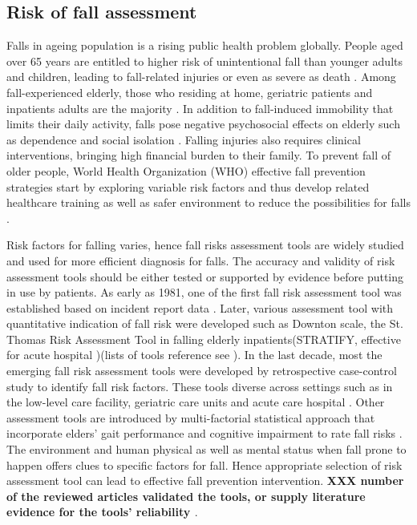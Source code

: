 \documentclass[conference,compsoc]{IEEEtran}
\begin{document}
\subsection{Risk of fall assessment}
Falls in ageing population is a rising public health problem globally. People aged over 65 years are entitled to higher risk of unintentional fall than younger adults and children, leading to fall-related injuries or even as severe as death \cite{who_2012}. Among fall-experienced elderly, those who residing at home, geriatric patients and inpatients adults are the majority \cite{Jung_2014}. In addition to fall-induced immobility that limits their daily activity, falls pose negative psychosocial effects on elderly such as dependence and social isolation \cite{Scheffer_2008}. Falling injuries also requires clinical interventions, bringing high financial burden to their family. 
To prevent fall of older people, World Health Organization (WHO) effective fall prevention strategies start by exploring variable risk factors and thus develop related healthcare training as well as safer environment to reduce the possibilities for falls \cite{who_2012}. 

Risk factors for falling varies, hence fall risks assessment tools are widely studied and used for more efficient diagnosis for falls. The accuracy and validity of risk assessment tools should be either tested or supported by evidence before putting in use by patients. As early as 1981, one of the first fall risk assessment tool was established based on incident report data \cite{Oulton_1981}. Later, various assessment tool with quantitative indication of fall risk were developed such as Downton scale, the St. Thomas Risk Assessment Tool in falling elderly inpatients(STRATIFY, effective for acute hospital \cite{Perell_2001})(lists of tools reference see \cite{Aranda_Gallardo_2013}). In the last decade, most the emerging fall risk assessment tools were developed by retrospective case-control study to identify fall risk factors. These tools diverse across settings such as in the low-level care facility\cite{van_Schooten_2020}, geriatric care units\cite{Michalcova_2020} and acute care hospital \cite{Chiu_2014, Aryee_2017}. Other assessment tools are introduced by multi-factorial statistical approach that incorporate elders' gait performance and cognitive impairment to rate fall risks \cite{Kikkert_2017,Taylor_2018}. 
The environment and human physical as well as mental status when fall prone to happen offers clues to specific factors for fall. Hence appropriate selection of risk assessment tool can lead to effective fall prevention intervention. \textbf{XXX number of the reviewed articles validated the tools, or supply literature evidence for the tools' reliability \cite{Myers_2003}}.
\end{document}
